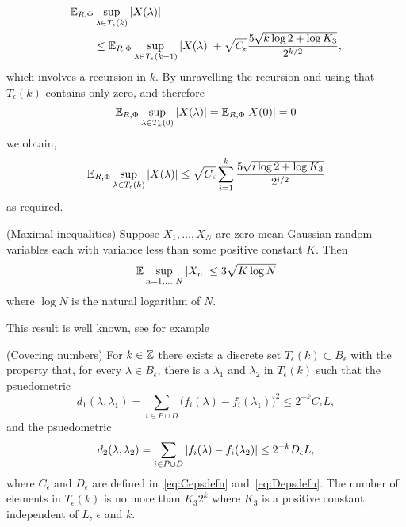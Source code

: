 \documentclass[journal]{IEEEtran}
\begin{document}
\begin{IEEEproof}
\begin{align*}
{\mathbb E}_{R,\Phi}&\sup_{\lambda \in T_\epsilon(k)}{\vert X(\lambda) \vert} \\
&\leq {\mathbb E}_{R,\Phi}\sup_{\lambda \in T_\epsilon(k-1)}{\vert X(\lambda) \vert} + \sqrt{C_\epsilon} \frac{5\sqrt{k \log 2 + \log K_3}}{2^{k/2}} ,
\end{align*}
which involves a recursion in $k$.  By unravelling the recursion and using that $T_\epsilon(k)$ contains only zero, and therefore
\[
{\mathbb E}_{R,\Phi} \sup_{\lambda \in T_k(0)} {\vert X(\lambda) \vert} = {\mathbb E}_{R,\Phi} {\vert X(0) \vert} = 0
\]
we obtain,
\[
{\mathbb E}_{R,\Phi}\sup_{\lambda \in T_\epsilon(k)}{\vert X(\lambda) \vert} \leq  \sqrt{C_\epsilon} \sum_{i=1}^k \frac{5\sqrt{i \log 2 + \log K_3}}{2^{i/2}}  
\]
as required.
\end{IEEEproof}

\begin{lemma}\label{lem:maxineq}(Maximal inequalities)
Suppose $X_1, \dots, X_N$ are zero mean Gaussian random variables each with variance less than some positive constant $K$.  Then
\[
{\mathbb E} \sup_{n = 1, \dots, N} {\left\vert X_n \right\vert} \leq 3  \sqrt{K \log N}
\]
where $\log N$ is the natural logarithm of $N$.
\end{lemma}
\begin{IEEEproof}
This result is well known, see for example~\cite[Section 3]{Pollard_asymp_empi_proc_1989}  
\end{IEEEproof}


\begin{lemma}\label{lem:metricentropy}(Covering numbers)
For $k \in {\mathbb Z}$ there exists a discrete set $T_\epsilon(k) \subset B_\epsilon$ with the property that, for every $\lambda \in B_\epsilon$, there is a $\lambda_1$ and $\lambda_2$ in $T_\epsilon(k)$ such that the psuedometric
\[
d_1(\lambda, \lambda_1) = \sum_{i \in P \cup D} \big( f_{i}(\lambda) - f_{i}(\lambda_1) \big)^2 \leq 2^{-k} C_\epsilon L,
\]
and the psuedometric
\[
d_2(\lambda, \lambda_2) = \sum_{i \in P \cup D} {\vert f_{i}(\lambda) - f_{i}(\lambda_2) \vert} \leq 2^{-k} D_\epsilon L,
\]
where $C_\epsilon$ and $D_\epsilon$ are defined in~\eqref{eq:Cepsdefn} and~\eqref{eq:Depsdefn}.  The number of elements in $T_\epsilon(k)$ is no more than $K_3 2^{k}$ where $K_3$ is a positive constant, independent of $L$, $\epsilon$ and $k$.
\end{lemma}
\begin{IEEEproof}

\end{IEEEproof}


\small

\end{document}
